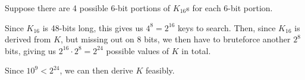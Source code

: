 \begin{enumerate}[label=(\alph*)]
\begin{enumerate}[label=(\roman*)]
        Suppose there are 4 possible 6-bit portions of $K_{16}$s for each 6-bit portion.

        Since $K_{16}$ is 48-bits long, this gives us $4^8 = 2^{16}$ keys to search. Then, since $K_{16}$ is derived from $K$, but missing out on 8 bits, we then have to bruteforce another $2^8$ bits, giving us $2^{16} \cdot 2^8 = 2^{24}$ possible values of $K$ in total.

        Since $10^9 < 2^{24}$, we can then derive $K$ feasibly.
 


        
    \end{enumerate}
    
\end{enumerate}
    

